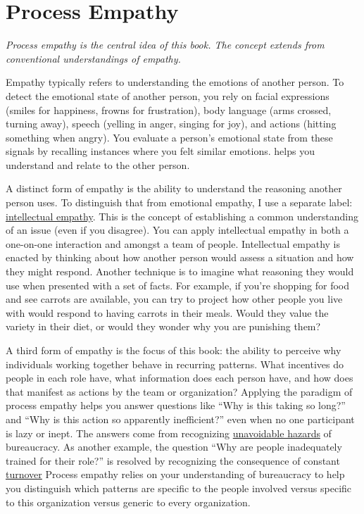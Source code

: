 \section{Process Empathy\label{sec:process-empathy}}

\textit{Process empathy is the central idea of this book. The concept extends from conventional understandings of empathy.}

Empathy typically refers to understanding the emotions of another person. To detect the emotional state of another person, you rely on facial expressions (smiles for happiness, frowns for frustration), body language (arms crossed, turning away), speech (yelling in anger, singing for joy), and actions (hitting something when angry). You evaluate a person's emotional state from these signals by recalling instances where you felt similar emotions. 
\iftoggle{glossarysubstitutionworks}{\Gls{emotional empathy}}{Emotional empathy} 
helps you understand and relate to the other person. 

A distinct form of empathy is the ability to understand the reasoning another person uses. 
To distinguish that from emotional empathy, I use a separate label: %
\hyperref[sec:intellectual-empathy]{intellectual empathy}.
This is the concept of establishing a common understanding of an issue (even if you disagree). You can apply intellectual empathy in both a one-on-one interaction and amongst a team of people. Intellectual empathy is enacted by thinking about how another person would assess a situation and how they might respond. Another technique is to imagine what reasoning they would use when presented with a set of facts. For example, if you're shopping for food and see carrots are available, you can try to project how other people you live with would respond to having carrots in their meals. Would they value the variety in their diet, or would they wonder why you are punishing them?


A third form of empathy is the focus of this book: the ability to perceive why individuals working together behave in recurring patterns. What incentives do people in each role have, what information does each person have, and how does that manifest as actions by the team or organization? Applying the paradigm of \gls{process empathy} 
\iftoggle{glossaryinmargin}{\marginpar{[Glossary]}}{}%
helps you answer questions like ``Why is this taking so long?'' and ``Why is this action so apparently inefficient?'' even when no one participant is lazy or inept. The answers come from recognizing 
\hyperref[sec:unavoidable-hazards]{unavoidable hazards}\iftoggle{haspagenumbers}{ (see page~\pageref{sec:unavoidable-hazards})}{}
of bureaucracy. As another example, the question ``Why are people inadequately trained for their role?'' is resolved by recognizing the consequence of  constant 
\hyperref[sec:turnover]{turnover}\iftoggle{haspagenumbers}{ (see page~\pageref{sec:turnover}).}{.}
Process empathy relies on your understanding of bureaucracy to help you distinguish which patterns are specific to the people involved versus specific to this organization versus generic to every organization.

